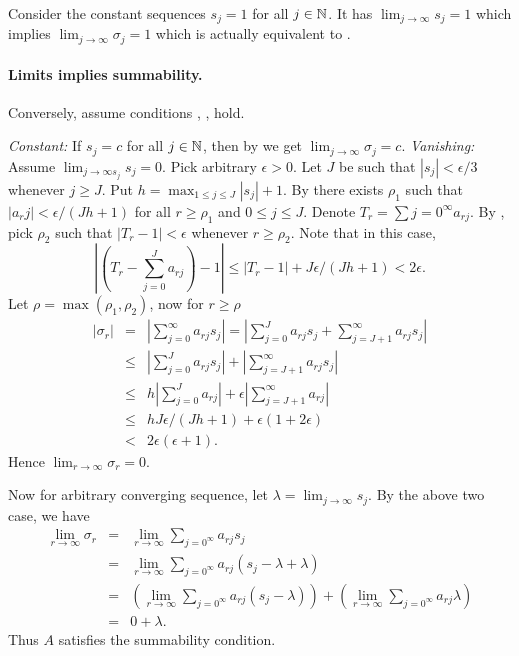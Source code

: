 \begin{enumerate}
Consider the constant sequences \(s_j=1\) for all \(j\in\mathbb{N}\).
It has \(\lim_{j\to\infty} s_j = 1\) which implies
 \(\lim_{j\to\infty} \sigma_j = 1\) which is actually equivalent
to .

\paragraph{Limits implies summability.}
Conversely, assume conditions , ,  hold.

\emph{Constant:} If \(s_j=c\) for all \(j\in\mathbb{N}\), 
then by  we get \(\lim_{j\to\infty}\sigma_j = c\).
\emph{Vanishing:} Assume \(\lim_{j\to\infty s_j} s_j = 0\).
Pick arbitrary \(\epsilon>0\). 
Let $J$ be such that \(|s_j| < \epsilon/3\) whenever \(j\geq J\).
Put \(h = \max_{1\leq j \leq J} |s_j| + 1\).
By  there exists \(\rho_1\) such that \(|a_rj| < \epsilon/(Jh+1)\)
for all \(r\geq\rho_1\) and \(0\leq j \leq J\).
Denote \(T_r = \sum{j=0}^\infty a_{rj}\).
By , pick \(\rho_2\) such that \(|T_r - 1| < \epsilon\)
whenever \(r\geq \rho_2\). 
Note that in this case, 
\[
\left|\left(T_r - \sum_{j=0}^J a_{rj}\right) - 1\right| 
\leq |T_r - 1| + J\epsilon/(Jh+1)
< 2\epsilon.\]
Let \(\rho = \max(\rho_1,\rho_2)\), now for \(r\geq \rho\)
\begin{eqnarray*}
|\sigma_r|
&=& \left|\sum_{j=0}^\infty a_{rj}s_j\right| 
 = \left|\sum_{j=0}^J a_{rj}s_j
        + \sum_{j=J+1}^\infty a_{rj}s_j\right| \\
&\leq&  \left|\sum_{j=0}^J a_{rj}s_j\right| 
      + \left|\sum_{j=J+1}^\infty a_{rj}s_j\right| \\
&\leq&  h\left|\sum_{j=0}^J a_{rj}\right| 
      + \epsilon\left|\sum_{j=J+1}^\infty a_{rj}\right| \\
&\leq&  hJ\epsilon/(Jh+1) + \epsilon(1+2\epsilon) \\
&<& 2\epsilon(\epsilon+1).
\end{eqnarray*}
Hence \(\lim_{r\to\infty} \sigma_r = 0\).

Now for arbitrary converging sequence, let \(\lambda = \lim_{j\to\infty} s_j\).
By the above two case, we have
\begin{eqnarray*}
\lim_{r\to\infty} \sigma_r 
&=& \lim_{r\to\infty} \sum_{j=0^\infty} a_{rj}s_j \\
&=& \lim_{r\to\infty} \sum_{j=0^\infty} a_{rj}(s_j - \lambda + \lambda) \\
&=& \left(\lim_{r\to\infty} \sum_{j=0^\infty} a_{rj}(s_j - \lambda)\right) + 
    \left(\lim_{r\to\infty} \sum_{j=0^\infty} a_{rj} \lambda\right) \\
&=& 0 + \lambda.
\end{eqnarray*}
Thus $A$ satisfies the summability condition.


\end{enumerate}
